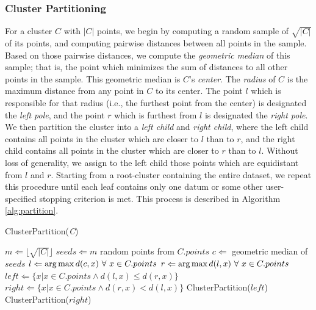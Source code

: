 \subsubsection {Cluster Partitioning}

For a cluster $C$ with $|C|$ points, we begin by computing a 
random sample of $\sqrt{|C|}$ of its points, and computing pairwise distances 
between all points in the sample. Based on those pairwise distances, we compute the \emph{geometric median} of this sample; 
that is, the point which minimizes the sum of distances to all other points in the sample. This geometric median 
is $C$'s \emph{center}. The \emph{radius} of $C$ is the maximum distance from any point in $C$ to its center.
The point $l$ which is responsible for that radius (i.e., the furthest point from the center) is designated the \emph{left pole}, and the point $r$ which is furthest
from $l$ is designated the \emph{right pole}. We then partition the cluster into a \emph{left child} and \emph{right child}, where the 
left child contains all points in the cluster which are closer to $l$ than to $r$, and the right child contains all 
points in the cluster which are closer to $r$ than to $l$. Without loss of generality, we assign to the left child 
those points which are equidistant from $l$ and $r$. Starting from a root-cluster containing the entire dataset, we 
repeat this procedure until each leaf contains only one datum or some other user-specified stopping criterion 
is met. This process is described in Algorithm \ref{alg:partition}.


\begin{algorithm} %
\caption{ClusterPartition(\emph{C})} %
\label{alg:partition} %
\begin{algorithmic} %
    \STATE $m \Leftarrow \lfloor \sqrt{|C|} \rfloor$
    \STATE $seeds \Leftarrow m$ random points from $C.points$
    \STATE $c \Leftarrow$ geometric median of $seeds$
    \STATE $l \Leftarrow \operatorname*{arg\,max} d(c,x) \ \forall \ x \in C.points$
    \STATE $r \Leftarrow \operatorname*{arg\,max} d(l,x) \ \forall \ x \in C.points$
    \STATE $left \Leftarrow \{x | x \in C.points \land d(l,x) \le d(r,x)\}$
    \STATE $right \Leftarrow \{x | x \in C.points \land d(r,x) < d(l,x)\}$
        \STATE ClusterPartition($left$)
    \ENDIF
        \STATE ClusterPartition($right$)
    \ENDIF
\end{algorithmic}
\end{algorithm}

